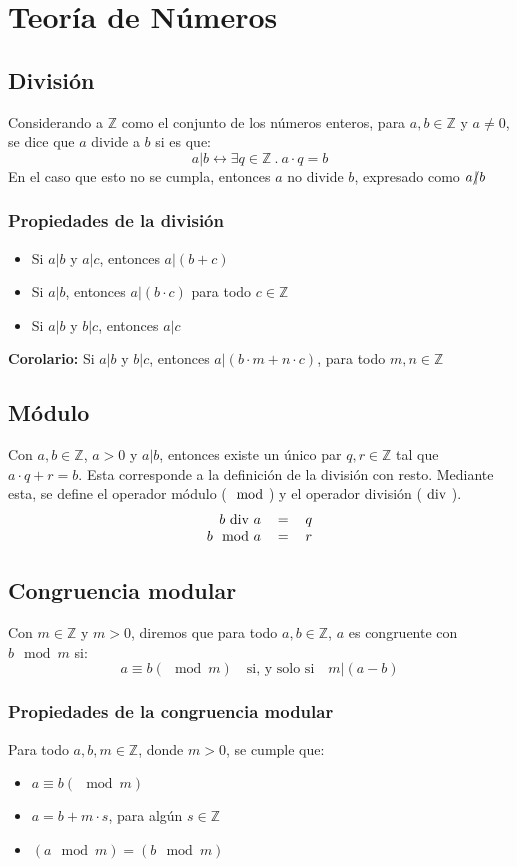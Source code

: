 \documentclass[../main.tex]{subfiles}
\begin{document}
\section{Teoría de Números}
\subsection{División}
Considerando a $\mathds{Z}$ como el conjunto de los números enteros, para $a, b \in \mathds{Z}$ y $a \not= 0$, se dice que $a$ divide a $b$ si es que:
\[ a | b \leftrightarrow \exists q \in \mathds{Z}\ .\ a \cdot q = b \]
En el caso que esto no se cumpla, entonces $a$ no divide $b$, expresado como $a \slashed{|} b$
\subsubsection{Propiedades de la división}
\begin{itemize}
    \item Si $a|b$ y $a|c$, entonces $a|(b + c)$
    \item Si $a|b$, entonces $a|(b \cdot c)$ para todo $c \in \mathds{Z}$
    \item Si $a|b$ y $b|c$, entonces $a|c$
\end{itemize}
\textbf{Corolario:} Si $a|b$ y $b|c$, entonces $a|(b \cdot m + n \cdot c)$, para todo $m, n \in \mathds{Z}$

\subsection{Módulo}
Con $a, b \in \mathds{Z}$, $a > 0$ y $a|b$, entonces existe un único par $q,r \in \mathds{Z}$ tal que
$a \cdot q + r = b$. Esta corresponde a la definición de la división con resto. Mediante esta, se define el operador módulo ($\mod$) y el operador división ($\text{ div }$).
\[
    \begin{tabular}{rcl}
        $b \division a$ & $=$ & $q$\\
        $b \mod a$ & $=$ & $r$
    \end{tabular}
\]

\subsection{Congruencia modular}
Con $m \in \mathds{Z}$ y $m > 0$, diremos que para todo $a,b \in \mathds{Z}$, $a$ es congruente con $b \mod m$ si:
\[ a \equiv b (\mod m) \quad \text{si, y solo si} \quad m | (a - b) \]

\subsubsection{Propiedades de la congruencia modular}
Para todo $a,b,m \in \mathds{Z}$, donde $m > 0$, se cumple que:
\begin{itemize}
    \item $a \equiv b (\mod m)$
    \item $a = b + m \cdot s$, para algún $s \in \mathds{Z}$
    \item $(a \mod m) = (b \mod m)$
\end{itemize}
\end{document}
